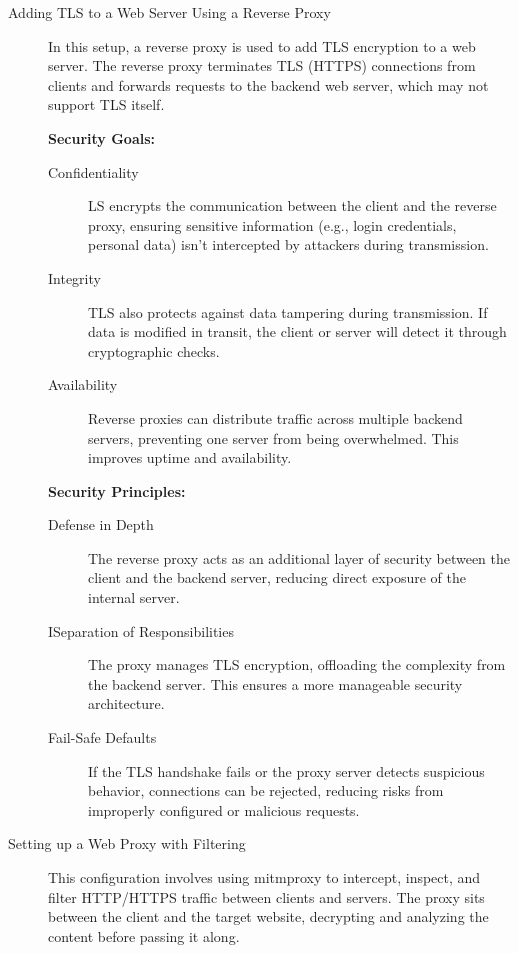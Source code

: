\documentclass[12pt,a4paper]{report}
\begin{document}
\begin{description}
	\item[Adding TLS to a Web Server Using a Reverse Proxy] In this setup, a reverse proxy is used to add TLS encryption to a web server. The reverse proxy terminates TLS (HTTPS) connections from clients and forwards requests to the backend web server, which may not support TLS itself.


\textbf{Security Goals:}
\begin{description}
	\item[Confidentiality] LS encrypts the communication between the client and the reverse proxy, ensuring sensitive information (e.g., login credentials, personal data) isn’t intercepted by attackers during transmission.
	\item[Integrity] TLS also protects against data tampering during transmission. If data is modified in transit, the client or server will detect it through cryptographic checks.
	\item [Availability] Reverse proxies can distribute traffic across multiple backend servers, preventing one server from being overwhelmed. This improves uptime and availability.
\end{description}


\textbf{Security Principles:}
\begin{description}
	\item[Defense in Depth] The reverse proxy acts as an additional layer of security between the client and the backend server, reducing direct exposure of the internal server.
	\item[ISeparation of Responsibilities] The proxy manages TLS encryption, offloading the complexity from the backend server. This ensures a more manageable security architecture.
	\item[Fail-Safe Defaults] If the TLS handshake fails or the proxy server detects suspicious behavior, connections can be rejected, reducing risks from improperly configured or malicious requests.
\end{description}

	
	
	\item[Setting up a Web Proxy with Filtering] This configuration involves using mitmproxy to intercept, inspect, and filter HTTP/HTTPS traffic between clients and servers. The proxy sits between the client and the target website, decrypting and analyzing the content before passing it along.
	

\end{description}
\end{document}
